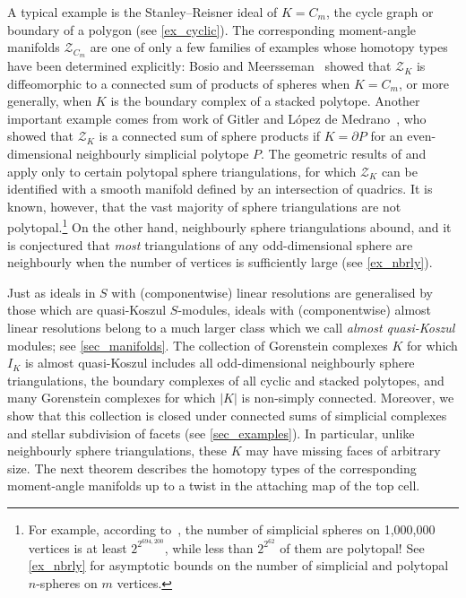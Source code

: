 \documentclass[a4paper,10pt]{amsart}
\theoremstyle{definition}
\theoremstyle{remark}
\begin{document}
A typical example is the Stanley--Reisner ideal of $K=C_m$, the cycle graph or boundary of a polygon (see \cref{ex_cyclic}). The corresponding moment-angle manifolds $\mathcal{Z}_{C_m}$ are one of only a few families of examples whose homotopy types have been determined explicitly: Bosio and Meersseman~\cite{BM} showed that $\mathcal{Z}_K$ is diffeomorphic to a connected sum of products of spheres when $K=C_m$, or more generally, when $K$ is the boundary complex of a stacked polytope. Another important example comes from work of Gitler and L\'opez de Medrano~\cite{GL}, who showed that $\mathcal{Z}_K$ is a connected sum of sphere products if $K=\partial P$ for an even-dimensional neighbourly simplicial polytope $P$. The geometric results of \cite{BM} and \cite{GL} apply only to certain polytopal sphere triangulations, for which $\mathcal{Z}_K$ can be identified with a smooth manifold defined by an intersection of quadrics. It is known, however, that the vast majority of sphere triangulations are not polytopal.\footnote{For example, according to~\cite{K}, the number of simplicial spheres on 1,000,000 vertices is at least $2^{2^{694,200}}$, while less than $2^{2^{62}}$ of them are polytopal! See \cref{ex_nbrly} for asymptotic bounds on the number of simplicial and polytopal $n$-spheres on $m$ vertices.} On the other hand, neighbourly sphere triangulations abound, and it is conjectured that \emph{most} triangulations of any odd-dimensional sphere are neighbourly when the number of vertices is sufficiently large (see \cref{ex_nbrly}).

Just as ideals in $S$ with (componentwise) linear resolutions are generalised by those which are quasi-Koszul $S$-modules, ideals with (componentwise) almost linear resolutions belong to a much larger class which we call \emph{almost quasi-Koszul} modules; see \cref{sec_manifolds}. The collection of Gorenstein complexes $K$ for which $I_K$ is almost quasi-Koszul includes all odd-dimensional neighbourly sphere triangulations, the boundary complexes of all cyclic and stacked polytopes, and many Gorenstein complexes for which $|K|$ is non-simply connected. Moreover, we show that this collection is closed under connected sums of simplicial complexes and stellar subdivision of facets (see \cref{sec_examples}). In particular, unlike neighbourly sphere triangulations, these $K$ may have missing faces of arbitrary size. The next theorem describes the homotopy types of the corresponding moment-angle manifolds up to a twist in the attaching map of the top cell.
\end{document}
